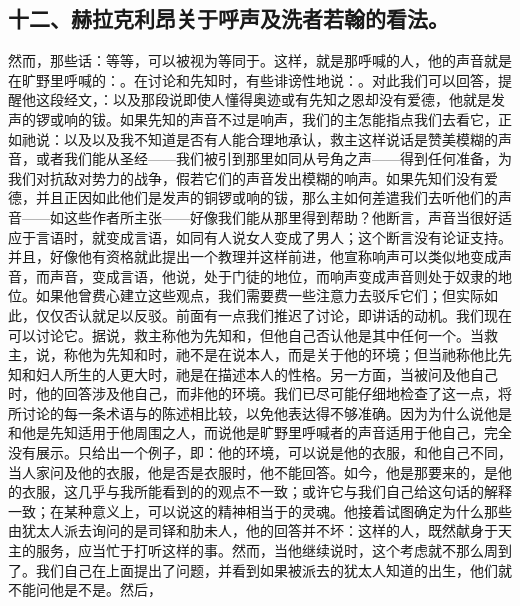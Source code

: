 
\subsection{十二、赫拉克利昂关于呼声及洗者若翰的看法。}

然而，那些话：等等，可以被视为等同于。这样，就是那呼喊的人，他的声音就是在旷野里呼喊的：。在讨论和先知时，有些诽谤性地说：。对此我们可以回答，提醒他这段经文，：以及那段说即使人懂得奥迹或有先知之恩却没有爱德，他就是发声的锣或响的钹。如果先知的声音不过是响声，我们的主怎能指点我们去看它，正如祂说：以及以及我不知道是否有人能合理地承认，救主这样说话是赞美模糊的声音，或者我们能从圣经——我们被引到那里如同从号角之声——得到任何准备，为我们对抗敌对势力的战争，假若它们的声音发出模糊的响声。如果先知们没有爱德，并且正因如此他们是发声的铜锣或响的钹，那么主如何差遣我们去听他们的声音——如这些作者所主张——好像我们能从那里得到帮助？他断言，声音当很好适应于言语时，就变成言语，如同有人说女人变成了男人；这个断言没有论证支持。并且，好像他有资格就此提出一个教理并这样前进，他宣称响声可以类似地变成声音，而声音，变成言语，他说，处于门徒的地位，而响声变成声音则处于奴隶的地位。如果他曾费心建立这些观点，我们需要费一些注意力去驳斥它们；但实际如此，仅仅否认就足以反驳。前面有一点我们推迟了讨论，即讲话的动机。我们现在可以讨论它。据说，救主称他为先知和，但他自己否认他是其中任何一个。当救主，说，称他为先知和时，祂不是在说本人，而是关于他的环境；但当祂称他比先知和妇人所生的人更大时，祂是在描述本人的性格。另一方面，当被问及他自己时，他的回答涉及他自己，而非他的环境。我们已尽可能仔细地检查了这一点，将所讨论的每一条术语与的陈述相比较，以免他表达得不够准确。因为为什么说他是和他是先知适用于他周围之人，而说他是旷野里呼喊者的声音适用于他自己，完全没有展示。只给出一个例子，即：他的环境，可以说是他的衣服，和他自己不同，当人家问及他的衣服，他是否是衣服时，他不能回答。如今，他是那要来的，是他的衣服，这几乎与我所能看到的的观点不一致；或许它与我们自己给这句话的解释一致；在某种意义上，可以说这的精神相当于的灵魂。他接着试图确定为什么那些由犹太人派去询问的是司铎和肋未人，他的回答并不坏：这样的人，既然献身于天主的服务，应当忙于打听这样的事。然而，当他继续说时，这个考虑就不那么周到了。我们自己在上面提出了问题，并看到如果被派去的犹太人知道的出生，他们就不能问他是不是。然后，